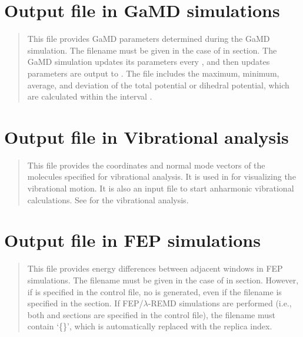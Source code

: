 \documentclass[a4paper,11pt,oneside,english]{sphinxmanual}
\begin{document}
\section{Output file in GaMD simulations}
\label{\detokenize{04_Output:output-file-in-gamd-simulations}}
\begin{quote}

This file provides GaMD parameters determined during the GaMD simulation.
The filename must be given in the case of  in \sphinxstylestrong{{[}GAMD{]}} section.
The GaMD simulation updates its parameters every , and then updates parameters
are output to .
The file includes the maximum, minimum, average, and deviation of the total potential or dihedral potential,
which are calculated within the interval .
\end{quote}


\section{Output file in Vibrational analysis}
\label{\detokenize{04_Output:output-file-in-vibrational-analysis}}
\begin{quote}

This file provides the coordinates and normal mode vectors of the molecules
specified for vibrational analysis. It is used in  for visualizing
the vibrational motion. It is also an input file to start anharmonic
vibrational calculations. See {\hyperref[\detokenize{18_Vibration:vibration}]{}} for the vibrational
analysis.
\end{quote}


\section{Output file in FEP simulations}
\label{\detokenize{04_Output:output-file-in-fep-simulations}}
\begin{quote}

This file provides energy differences between adjacent windows in FEP simulations.
The filename must be given in the case of  in \sphinxstylestrong{{[}ALCHEMY{]}} section.
However, if  is specified in the control file,
no  is generated, even if the filename is specified
in the \sphinxstylestrong{{[}OUTPUT{]}} section.
If FEP/\(\lambda\)-REMD simulations are performed
(i.e., both \sphinxstylestrong{{[}REMD{]}} and \sphinxstylestrong{{[}ALCHEMY{]}} sections are specified in the control file),
the filename must contain ‘\{\}’, which is automatically replaced with the replica index.
\end{quote}
\end{document}
